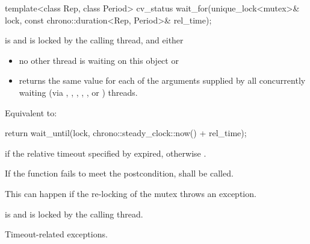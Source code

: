 
%
\begin{itemdecl}
template<class Rep, class Period>
  cv_status wait_for(unique_lock<mutex>& lock,
                     const chrono::duration<Rep, Period>& rel_time);
\end{itemdecl}
\begin{itemdescr}
 \pnum \requires {} is  and 
        is locked by the calling thread, and either
        \begin{itemize}
         \item no other thread is waiting on this  object or
         \item {} returns the same value for each of the  arguments
                supplied by all concurrently waiting (via ,
                , ,
                {\color{insertcolor} , , or }) threads.
        \end{itemize}

 \pnum \effects Equivalent to:
\begin{codeblock}
return wait_until(lock, chrono::steady_clock::now() + rel_time);
\end{codeblock}

 \pnum \returns {} if
                the relative timeout specified by  expired,
                otherwise .

 \pnum \remarks
                If the function fails to meet the postcondition, 
                shall be called.
                \begin{note} This can happen if the re-locking of the mutex throws an exception. \end{note}

 \pnum \postconditions {} is  and 
        is locked by the calling thread.

 \pnum \throws Timeout-related exceptions.
\end{itemdescr}


